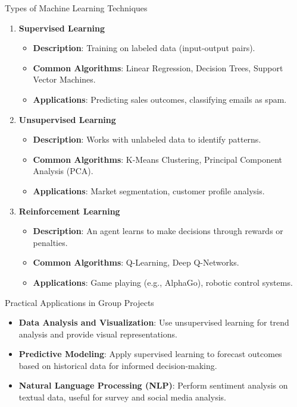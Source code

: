 \documentclass[aspectratio=169]{beamer}
\begin{document}
\begin{frame}{Types of Machine Learning Techniques}
  \begin{enumerate}
    \item \textbf{Supervised Learning}
      \begin{itemize}
        \item \textbf{Description}: Training on labeled data (input-output pairs).
        \item \textbf{Common Algorithms}: Linear Regression, Decision Trees, Support Vector Machines.
        \item \textbf{Applications}: Predicting sales outcomes, classifying emails as spam.
      \end{itemize}
      
    \item \textbf{Unsupervised Learning}
      \begin{itemize}
        \item \textbf{Description}: Works with unlabeled data to identify patterns.
        \item \textbf{Common Algorithms}: K-Means Clustering, Principal Component Analysis (PCA).
        \item \textbf{Applications}: Market segmentation, customer profile analysis.
      \end{itemize}
      
    \item \textbf{Reinforcement Learning}
      \begin{itemize}
        \item \textbf{Description}: An agent learns to make decisions through rewards or penalties.
        \item \textbf{Common Algorithms}: Q-Learning, Deep Q-Networks.
        \item \textbf{Applications}: Game playing (e.g., AlphaGo), robotic control systems.
      \end{itemize}
  \end{enumerate}
\end{frame}

\begin{frame}{Practical Applications in Group Projects}
  \begin{itemize}
    \item \textbf{Data Analysis and Visualization}: Use unsupervised learning for trend analysis and provide visual representations.
    \item \textbf{Predictive Modeling}: Apply supervised learning to forecast outcomes based on historical data for informed decision-making.
    \item \textbf{Natural Language Processing (NLP)}: Perform sentiment analysis on textual data, useful for survey and social media analysis.
  \end{itemize}
\end{frame}
\end{document}
